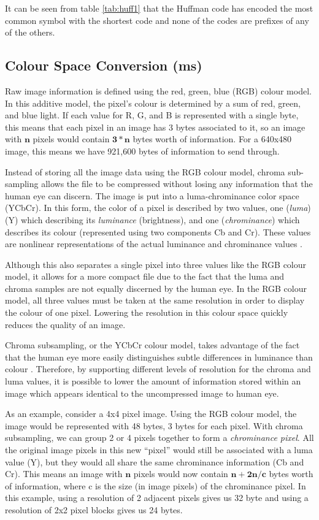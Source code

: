 It can be seen from table \ref{tab:huff1} that the Huffman code has encoded the most common symbol with the shortest code and none of the codes are prefixes of any of the others.

\subsection{Colour Space Conversion (ms)}
\label{sec:colour_space_conversion}
Raw image information is defined using the red, green, blue (RGB) colour model.
In this additive model, the pixel's colour is determined by a sum of red, green, and blue light. 
If each value for R, G, and B is represented with a single byte, 
this means that each pixel in an image has 3 bytes associated to it, so 
an image with $\mathbf{n}$ pixels would contain $\mathbf{3*n}$ bytes worth of information. 
For a 640x480 image, this means we have 921,600 bytes of information to send through.

Instead of storing all the image data using the RGB colour model, 
chroma sub-sampling allows the file to be compressed
without losing any information that the human eye can discern. 
The image is put into a luma-chrominance color space (YCbCr). 
In this form, the color of a pixel is described by two values, 
one (\emph{luma}) (Y) which describing its \emph{luminance} (brightness), and 
one (\emph{chrominance}) which describes its colour 
(represented using two components Cb and Cr).
These values are nonlinear representations
of the actual luminance and chrominance values \cite{kerr_chroma_subsampling}.

Although this also separates a single pixel into three values like the RGB colour model, 
it allows for a more compact file due to the fact that the luma and chroma samples 
are not equally discerned by the human eye. 
In the RGB colour model, all three values must be taken at 
the same resolution in order to display the colour of one pixel. 
Lowering the resolution in this colour space quickly reduces the quality of an image. 

Chroma subsampling, or the YCbCr colour model, takes advantage of the fact that the human eye 
more easily distinguishes subtle differences in luminance than colour \cite{kerr_chroma_subsampling}.
Therefore, by supporting different levels of resolution for the chroma and luma values, 
it is possible to lower the amount of information stored 
within an image which appears identical to the uncompressed image to human eye.

As an example, consider a 4x4 pixel image. 
Using the RGB colour model, the image would be represented with 48 bytes, 3 bytes for each pixel. 
With chroma subsampling, we can group 2 or 4 pixels together to form a \emph{chrominance pixel}. 
All the original image pixels in this new ``pixel'' would still be associated with a luma value (Y), but 
they would all share the same chrominance information (Cb and Cr). 
This means an image with $\mathbf{n}$ pixels would 
now contain $\mathbf{n+2n/c}$ bytes worth of information, where 
c is the size (in image pixels) of the chrominance pixel. 
In this example, using a resolution of 2 adjacent pixels 
gives us 32 byte and using a resolution of 2x2 pixel blocks 
gives us 24 bytes.


